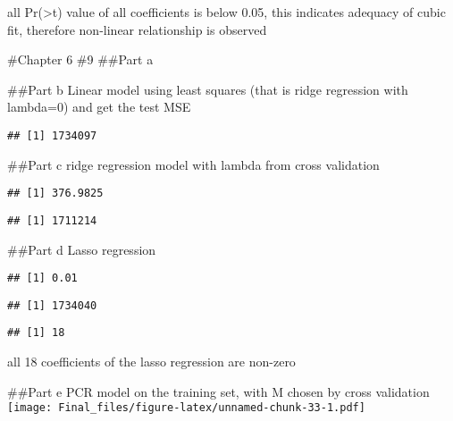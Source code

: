\documentclass[
]{article}
\begin{document}
all Pr(\textgreater\textbar t\textbar) value of all coefficients is
below 0.05, this indicates adequacy of cubic fit, therefore non-linear
relationship is observed

\#Chapter 6 \#9 \#\#Part a

\#\#Part b Linear model using least squares (that is ridge regression
with lambda=0) and get the test MSE

\begin{verbatim}
## [1] 1734097
\end{verbatim}

\#\#Part c ridge regression model with lambda from cross validation

\begin{verbatim}
## [1] 376.9825
\end{verbatim}

\begin{verbatim}
## [1] 1711214
\end{verbatim}

\#\#Part d Lasso regression

\begin{verbatim}
## [1] 0.01
\end{verbatim}

\begin{verbatim}
## [1] 1734040
\end{verbatim}

\begin{verbatim}
## [1] 18
\end{verbatim}

all 18 coefficients of the lasso regression are non-zero

\#\#Part e PCR model on the training set, with M chosen by cross
validation
\texttt{[image: Final\_files/figure-latex/unnamed-chunk-33-1.pdf]}
\end{document}
